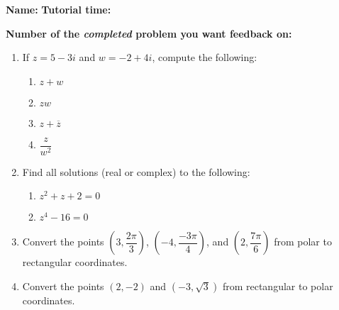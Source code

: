 \documentclass[12pt]{article}
\begin{document}
{\bf \large Name:} \hspace{2.5in} {\bf Tutorial time:}

\bigskip

{\bf Number of the {\em completed} problem you want feedback on:}

\bigskip

\thispagestyle{fancy}

 \begin{enumerate}
 \item  If $z=5-3i$ and $w=-2+4i$, compute the following:
\begin{enumerate}
 \item $z+w$

\vspace{2cm}

 \item $zw$

\vspace{2cm}

 \item $z+\overline{z}$

\vspace{2cm}

 \item $\dfrac{z}{w^2}$

\vspace{2cm}
\end{enumerate}

 \item Find all solutions (real or complex) to the following:
\begin{enumerate}
 \item $z^2+z+2=0$

\vspace{3cm}

 \item $z^4-16=0$
\end{enumerate}
\newpage

\item Convert the points $\left(3,\dfrac{2\pi}{3}\right)$, $\left(-4,\dfrac{-3\pi}{4}\right)$, and $\left(2, \dfrac{7\pi}{6}\right)$ from polar to rectangular coordinates.

\vspace{5cm}

\item Convert the points $(2,-2)$ and $(-3, \sqrt{3})$ from rectangular to polar coordinates.

\vspace{4cm}


\end{enumerate}
\end{document}

